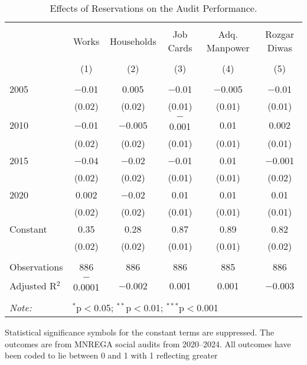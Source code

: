 \begin{table}[!htbp]
\centering
\begin{threeparttable}

  \caption{Effects of Reservations on the Audit Performance.} 
  \label{main_mnrega_audit_res} 
\scriptsize 
\begin{tabular}{@{\extracolsep{0pt}}lccccc} 
\\[-1.8ex]\hline 
\hline \\[-1.8ex] 
 & Works & Households & Job Cards & Adq. Manpower & Rozgar Diwas \\ 
\\[-1.8ex] & (1) & (2) & (3) & (4) & (5)\\ 
\hline \\[-1.8ex] 
 2005 & $-$0.01 & 0.005 & $-$0.01 & $-$0.005 & $-$0.01 \\ 
  & (0.02) & (0.02) & (0.01) & (0.01) & (0.01) \\ 
  2010 & $-$0.01 & $-$0.005 & $-$0.001 & 0.01 & 0.002 \\ 
  & (0.02) & (0.02) & (0.01) & (0.01) & (0.01) \\ 
  2015 & $-$0.04 & $-$0.02 & $-$0.01 & 0.01 & $-$0.001 \\ 
  & (0.02) & (0.02) & (0.01) & (0.01) & (0.02) \\ 
  2020 & 0.002 & $-$0.02 & 0.01 & 0.01 & 0.01 \\ 
  & (0.02) & (0.02) & (0.01) & (0.01) & (0.01) \\ 
  Constant & 0.35 & 0.28 & 0.87 & 0.89 & 0.82 \\ 
  & (0.02) & (0.02) & (0.01) & (0.01) & (0.02) \\ 
 \hline \\[-1.8ex] 
Observations & 886 & 886 & 886 & 885 & 886 \\ 
Adjusted R$^{2}$ & $-$0.0001 & $-$0.002 & 0.001 & 0.001 & $-$0.003 \\ 
\hline 
\hline \\[-1.8ex] 
\textit{Note:}  & \multicolumn{5}{l}{$^{*}$p$<$0.05; $^{**}$p$<$0.01; $^{***}$p$<$0.001} \\ 
\end{tabular} 
\begin{tablenotes}[flushleft]
\scriptsize
\item[] Statistical significance symbols for the constant terms are suppressed. The outcomes are from MNREGA social audits from 2020--2024.
                                        All outcomes have been coded to lie between 0 and 1 with 1 reflecting greater 

\end{tablenotes}
\end{threeparttable}
\end{table}
